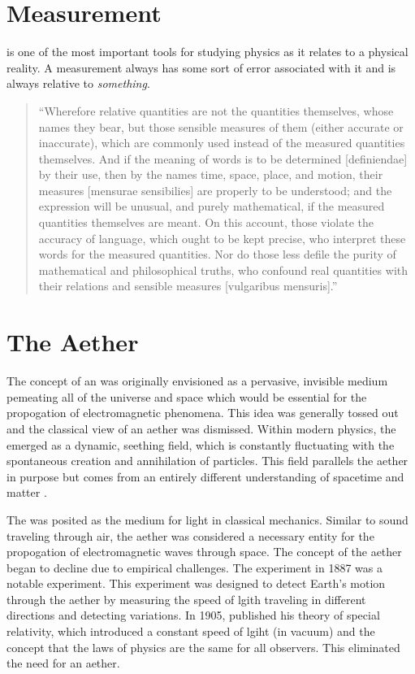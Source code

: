 \section{Measurement}

 is one of the most important tools for studying physics as it relates to a physical reality. A measurement always has some sort of error associated with it and is always relative to \textit{something}.

\begin{quotation}
	``Wherefore relative quantities are not the quantities themselves, whose names they bear, but those sensible measures of them (either accurate or inaccurate), which are commonly used instead of the measured quantities themselves. And if the meaning of words is to be determined [definiendae] by their use, then by the names time, space, place, and motion, their measures [mensurae sensibilies] are properly to be understood; and the expression will be unusual, and purely mathematical, if the measured quantities themselves are meant. On this account, those violate the accuracy of language, which ought to be kept precise, who interpret these words for the measured quantities. Nor do those less defile the purity of mathematical and philosophical truths, who confound real quantities with their relations and sensible measures [vulgaribus mensuris].'' \cite{bib:Newtons Scholium}
\end{quotation}


\section{The Aether}

The concept of an   was originally envisioned as a pervasive, invisible medium pemeating all of the universe and space which would be essential for the propogation of electromagnetic phenomena. This idea was generally tossed out and the classical view of an aether was dismissed. Within modern physics, the  emerged as a dynamic, seething field, which is constantly fluctuating with the spontaneous creation and annihilation of particles. This field parallels the aether in purpose but comes from an entirely different understanding of spacetime and matter \cite{bib:Being, Nothingness, and the Quantum Vacuum}.

The  was posited as the medium for light in classical mechanics. Similar to sound traveling through air, the aether was considered a necessary entity for the propogation of electromagnetic waves through space. The concept of the aether began to decline due to empirical challenges. The  experiment in 1887 was a notable experiment. This experiment was designed to detect Earth's motion through the aether by measuring the speed of lgith traveling in different directions and detecting variations\cite{bib:The Michelson-Morley Experiment}. In 1905,  published his theory of special relativity, which introduced a constant speed of lgiht (in vacuum) and the concept that the laws of physics are the same for all observers. This eliminated the need for an aether.

